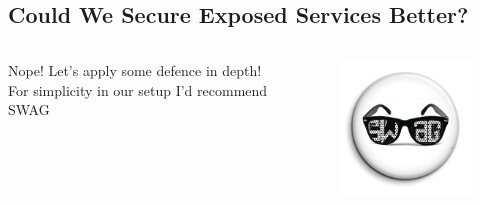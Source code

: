 \documentclass{beamer}
\begin{document}
\subsection{Could We Secure Exposed Services Better?}

\begin{frame}
    \begin{columns}
        \begin{column}{0.5\textwidth}
            Nope! Let's apply some defence in depth! For simplicity in our setup I'd recommend SWAG
        \end{column}
        \begin{column}{0.5\textwidth}
            \begin{figure}
                \centering
                \includegraphics[width=1\textwidth,keepaspectratio]{../resources/wrong_swag.jpg}
            \end{figure}
        \end{column}
    \end{columns}
\end{frame}
\end{document}
